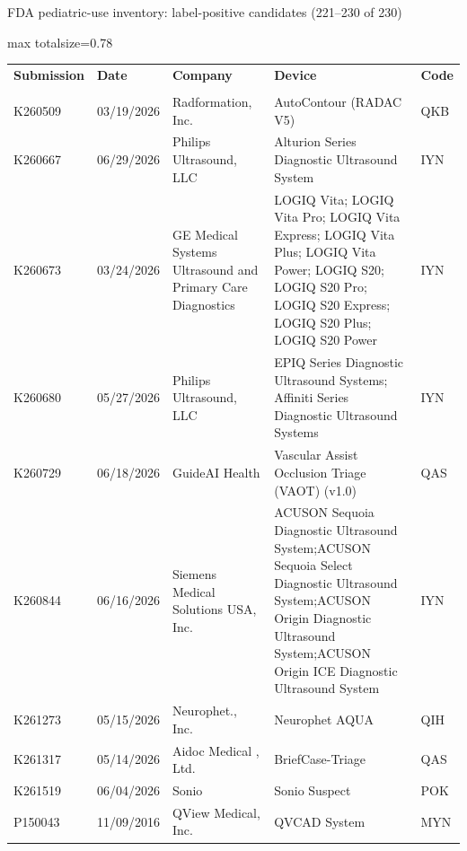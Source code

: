 \documentclass[aspectratio=169]{beamer}
\renewcommand{\arraystretch}{1.08}
\begin{document}
\begin{frame}[category=FDA appendix]{FDA pediatric-use inventory: label-positive candidates (221--230 of 230)}
\begin{adjustbox}{max totalsize={\textwidth}{0.78\textheight}}
\renewcommand{\arraystretch}{1.2}
\begin{tabular}{|p{}|p{}|p{}|p{}|p{}|}
\hline \textbf{Submission} & \textbf{Date} & \textbf{Company} & \textbf{Device} & \textbf{Code} \\\\ \hline
K260509 & 03/19/2026 & Radformation, Inc. & AutoContour (RADAC V5) & QKB \\ \hline
K260667 & 06/29/2026 & Philips Ultrasound, LLC & Alturion Series Diagnostic Ultrasound System & IYN \\ \hline
K260673 & 03/24/2026 & GE Medical Systems Ultrasound and Primary Care Diagnostics & LOGIQ Vita; LOGIQ Vita Pro; LOGIQ Vita Express; LOGIQ Vita Plus; LOGIQ Vita Power; LOGIQ S20; LOGIQ S20 Pro; LOGIQ S20 Express; LOGIQ S20 Plus; LOGIQ S20 Power & IYN \\ \hline
K260680 & 05/27/2026 & Philips Ultrasound, LLC & EPIQ Series Diagnostic Ultrasound Systems; Affiniti Series Diagnostic Ultrasound Systems & IYN \\ \hline
K260729 & 06/18/2026 & GuideAI Health & Vascular Assist Occlusion Triage (VAOT) (v1.0) & QAS \\ \hline
K260844 & 06/16/2026 & Siemens Medical Solutions USA, Inc. & ACUSON Sequoia Diagnostic Ultrasound System;ACUSON Sequoia Select Diagnostic Ultrasound System;ACUSON Origin Diagnostic Ultrasound System;ACUSON Origin ICE Diagnostic Ultrasound System & IYN \\ \hline
K261273 & 05/15/2026 & Neurophet., Inc. & Neurophet AQUA & QIH \\ \hline
K261317 & 05/14/2026 & Aidoc Medical , Ltd. & BriefCase-Triage & QAS \\ \hline
K261519 & 06/04/2026 & Sonio & Sonio Suspect & POK \\ \hline
P150043 & 11/09/2016 & QView Medical, Inc. & QVCAD System & MYN \\ \hline
\end{tabular}
\end{adjustbox}
\end{frame}
\end{document}
